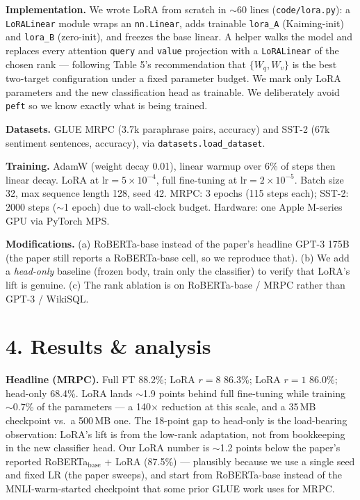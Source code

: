 \documentclass[11pt]{article}
\begin{document}
\textbf{Implementation.} We wrote LoRA from scratch in $\sim$60 lines
(\texttt{code/lora.py}): a \texttt{LoRALinear} module wraps an
\texttt{nn.Linear}, adds trainable \texttt{lora\_A} (Kaiming-init) and
\texttt{lora\_B} (zero-init), and freezes the base linear. A helper walks
the model and replaces every attention \texttt{query} and \texttt{value}
projection with a \texttt{LoRALinear} of the chosen rank --- following
Table 5's recommendation that $\{W_q, W_v\}$ is the best two-target
configuration under a fixed parameter budget. We mark only LoRA parameters
and the new classification head as trainable. We deliberately avoid
\texttt{peft} so we know exactly what is being trained.

\textbf{Datasets.} GLUE MRPC (3.7k paraphrase pairs, accuracy) and SST-2
(67k sentiment sentences, accuracy), via \texttt{datasets.load\_dataset}.

\textbf{Training.} AdamW (weight decay 0.01), linear warmup over 6\% of
steps then linear decay. LoRA at $\text{lr}{=}5\!\times\!10^{-4}$,
full fine-tuning at $\text{lr}{=}2\!\times\!10^{-5}$. Batch size 32, max
sequence length 128, seed 42. MRPC: 3 epochs (115 steps each); SST-2: 2000
steps ($\sim$1 epoch) due to wall-clock budget. Hardware: one Apple M-series
GPU via PyTorch MPS.

\textbf{Modifications.} (a) RoBERTa-base instead of the paper's headline
GPT-3 175B (the paper still reports a RoBERTa-base cell, so we reproduce
that). (b) We add a \emph{head-only} baseline (frozen body, train only the
classifier) to verify that LoRA's lift is genuine. (c) The rank ablation
is on RoBERTa-base / MRPC rather than GPT-3 / WikiSQL.

\section*{4. Results \& analysis}

\textbf{Headline (MRPC).} Full FT 88.2\%; LoRA $r{=}8$ 86.3\%; LoRA $r{=}1$
86.0\%; head-only 68.4\%. LoRA lands $\sim$1.9 points behind full
fine-tuning while training $\sim$0.7\% of the parameters --- a 140$\times$
reduction at this scale, and a 35\,MB checkpoint vs.\ a 500\,MB one. The
18-point gap to head-only is the load-bearing observation: LoRA's lift is
from the low-rank adaptation, not from bookkeeping in the new classifier
head. Our LoRA number is $\sim$1.2 points below the paper's reported
RoBERTa$_\text{base}$ + LoRA (87.5\%) --- plausibly because we use a
single seed and fixed LR (the paper sweeps), and start from RoBERTa-base
instead of the MNLI-warm-started checkpoint that some prior GLUE work
uses for MRPC.
\end{document}
